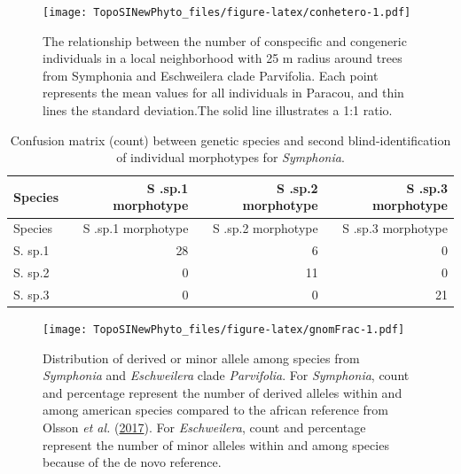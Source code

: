\documentclass[12pt,]{article}
\begin{document}
\newpage

\begin{figure}
\centering
\texttt{[image: TopoSINewPhyto\_files/figure-latex/conhetero-1.pdf]}
\caption{\label{fig:conhetero}The relationship between the number of conspecific and congeneric individuals in a local neighborhood with 25 m radius around trees from Symphonia and Eschweilera clade Parvifolia. Each point represents the mean values for all individuals in Paracou, and thin lines the standard deviation.The solid line illustrates a 1:1 ratio.}
\end{figure}

\newpage

\begin{longtable}[]{@{}lrrr@{}}
\caption{\label{tab:blindIdentification}Confusion matrix (count) between genetic species and second blind-identification of individual morphotypes for \emph{Symphonia}.}\tabularnewline
\toprule
Species & S .sp.1 morphotype & S .sp.2 morphotype & S .sp.3 morphotype\tabularnewline
\midrule
\endfirsthead
\toprule
Species & S .sp.1 morphotype & S .sp.2 morphotype & S .sp.3 morphotype\tabularnewline
\midrule
\endhead
S. sp.1 & 28 & 6 & 0\tabularnewline
S. sp.2 & 0 & 11 & 0\tabularnewline
S. sp.3 & 0 & 0 & 21\tabularnewline
\bottomrule
\end{longtable}

\newpage

\begin{figure}
\centering
\texttt{[image: TopoSINewPhyto\_files/figure-latex/gnomFrac-1.pdf]}
\caption{\label{fig:gnomFrac}Distribution of derived or minor allele among species from \emph{Symphonia} and \emph{Eschweilera} clade \emph{Parvifolia}. For \emph{Symphonia}, count and percentage represent the number of derived alleles within and among american species compared to the african reference from Olsson \emph{et al.} (\protect\hyperlink{ref-Olsson2017}{2017}). For \emph{Eschweilera}, count and percentage represent the number of minor alleles within and among species because of the de novo reference.}
\end{figure}
\end{document}
